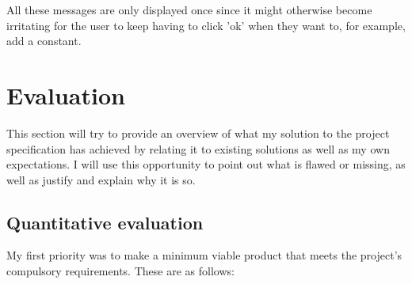 \documentclass{report}
\begin{document}
\noindent All these messages are only displayed once since it might otherwise 
become irritating for the user to keep having to click 'ok' when they want to, 
for example, add a constant.


\chapter{Evaluation}
This section will try to provide an overview of what my solution to the project 
specification has achieved by relating it to existing solutions as well as my 
own expectations. I will use this opportunity to point out what is flawed or 
missing, as well as justify and explain why it is so.

\section{Quantitative evaluation}
My first priority was to make a minimum viable product that meets the project's 
compulsory requirements. These are as follows:
\end{document}
